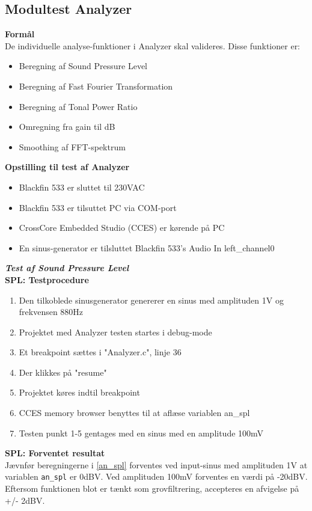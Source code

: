 \subsection{Modultest Analyzer}

\textbf{Formål} \\
De individuelle analyse-funktioner i Analyzer skal valideres. Disse funktioner er:
\begin{itemize}
	\item Beregning af Sound Pressure Level
	\item Beregning af Fast Fourier Transformation
	\item Beregning af Tonal Power Ratio
	\item Omregning fra gain til dB
	\item Smoothing af FFT-spektrum
\end{itemize}

\textbf{Opstilling til test af Analyzer}
\begin{itemize}
	\item Blackfin 533 er sluttet til 230VAC
	\item Blackfin 533 er tilsuttet PC via COM-port
	\item CrossCore Embedded Studio (CCES) er kørende på PC
	\item En sinus-generator er tilsluttet Blackfin 533's Audio In left\_channel0
\end{itemize}

\textbf{\textit{Test af Sound Pressure Level}}\\
\textbf{SPL: Testprocedure}
\begin{enumerate}
	\item Den tilkoblede sinusgenerator genererer en sinus med amplituden 1V og frekvensen 880Hz	
	\item Projektet med Analyzer testen startes i debug-mode
	\item Et breakpoint sættes i "Analyzer.c", linje 36 
	\item Der klikkes på "resume"
	\item Projektet køres indtil breakpoint
	\item CCES memory browser benyttes til at aflæse variablen an\_spl 
	\item Testen punkt 1-5 gentages med en sinus med en amplitude 100mV
\end{enumerate}

\textbf{SPL: Forventet resultat} \\
Jævnfør beregningerne i \ref{an_spl} forventes ved input-sinus med amplituden 1V at variablen \verb+an_spl+ er 0dBV. Ved amplituden 100mV forventes en værdi på -20dBV. Eftersom funktionen blot er tænkt som grovfiltrering, accepteres en afvigelse på +/- 2dBV.

